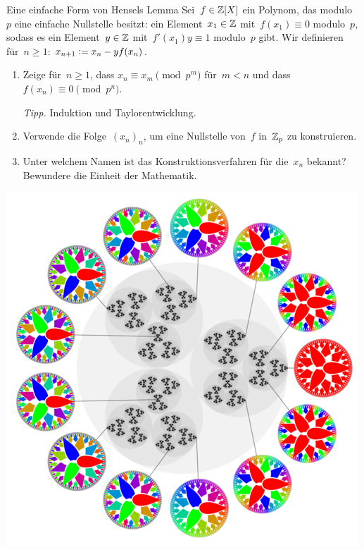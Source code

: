 \documentclass[entwurf]{uebblatt}
\begin{document}
\begin{aufgabe}{Eine einfache Form von Hensels Lemma}
Sei~$f \in \mathbb{Z}[X]$ ein
Polynom, das modulo~$p$ eine einfache Nullstelle besitzt: ein Element~$x_1
\in \mathbb{Z}$ mit~$f(x_1) \equiv 0$ modulo~$p$, sodass es ein Element~$y \in \mathbb{Z}$
mit~$f'(x_1) y \equiv 1$ modulo~$p$ gibt.
Wir definieren für~$n \geq 1$: $x_{n+1} \vcentcolon= x_n - y f(x_n)$.
\begin{enumerate}
\item Zeige für~$n \geq 1$, dass $x_n \equiv x_m \pmod{p^m}$ für~$m < n$ und dass~$f(x_n) \equiv 0 \pmod{p^n}$.

{\tiny\emph{Tipp.} Induktion und Taylorentwicklung.\par}
\item Verwende die Folge~$(x_n)_n$, um eine Nullstelle von~$f$ in~$\mathbb{Z}_p$ zu
konstruieren.
\item Unter welchem Namen ist das Konstruktionsverfahren für die~$x_n$ bekannt?
Bewundere die Einheit der Mathematik.
\end{enumerate}
\end{aufgabe}

{\centering\href{https://en.wikipedia.org/wiki/P-adic_number}{\includegraphics[scale=0.24]{images/p-adic-numbers}}\par}
\end{document}
